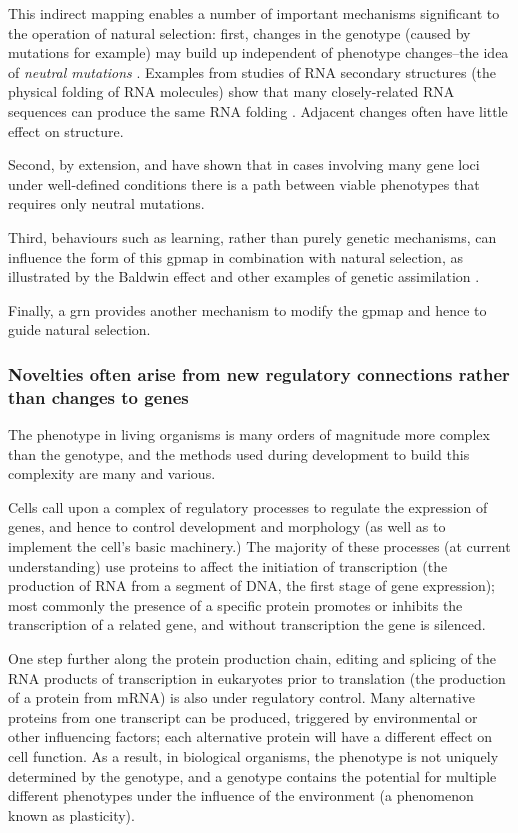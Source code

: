 This indirect mapping enables a number of important mechanisms significant to the operation of natural selection: first, changes in the genotype (caused by mutations for example) may build up independent of phenotype changes--the idea of \emph{neutral mutations} \parencite{Ohta:1996vn,Ohta:2002ys,Ohta:1973kx}. Examples from studies of RNA secondary structures (the physical folding of RNA molecules) show that many closely-related RNA sequences can produce the same RNA folding \parencite{Fontana:1993zn}. Adjacent changes often have little effect on structure.

Second, by extension, \parencite{Gavrilets:1997qt} and \parencite{Gravner:2007yd} have shown that in cases involving many gene loci under well-defined conditions there is a path between viable phenotypes that requires only neutral mutations.

Third, behaviours such as learning, rather than purely genetic mechanisms, can influence the form of this \gls{gpmap} in combination with natural selection, as illustrated by the Baldwin effect \parencite{Baldwin:1896ly} and other examples of genetic assimilation \cite{Hinton:1987vy,Siegal:2002qn,Waddington:1942jb}.

Finally, a \gls{grn} provides another mechanism to modify the \gls{gpmap} and hence to guide natural selection.

\subsubsection{Novelties often arise from new regulatory connections rather than changes to genes}

The phenotype in living organisms is many orders of magnitude more complex than the genotype, and the methods used during development to build this complexity are many and various.

Cells call upon a complex of regulatory processes to regulate the expression of genes, and hence to control development and morphology (as well as to implement the cell's basic machinery.) The majority of these processes (at current understanding) use proteins to affect the initiation of transcription (the production of RNA from a segment of DNA, the first stage of gene expression); most commonly the presence of a specific protein promotes or inhibits the transcription of a related gene, and without transcription the gene is silenced.

One step further along the protein production chain, editing and splicing of the RNA products of transcription in eukaryotes prior to translation (the production of a protein from mRNA) is also under regulatory control. Many alternative proteins from one transcript can be produced, triggered by environmental or other influencing factors; each alternative protein will have a different effect on cell function. As a result, in biological organisms, the phenotype is not uniquely determined by the genotype, and a genotype contains the potential for multiple different phenotypes under the influence of the environment (a phenomenon known as plasticity).

